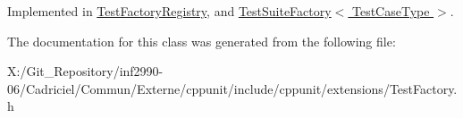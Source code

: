 Implemented in \hyperlink{class_test_factory_registry_a75fd01e6d565fb0f576ed1a887655089}{Test\-Factory\-Registry}, and \hyperlink{class_test_suite_factory_a0790b11de1543fa894acd7069fd1f327}{Test\-Suite\-Factory$<$ Test\-Case\-Type $>$}.



The documentation for this class was generated from the following file\-:\begin{DoxyCompactItemize}
\item 
X\-:/\-Git\-\_\-\-Repository/inf2990-\/06/\-Cadriciel/\-Commun/\-Externe/cppunit/include/cppunit/extensions/Test\-Factory.\-h\end{DoxyCompactItemize}
